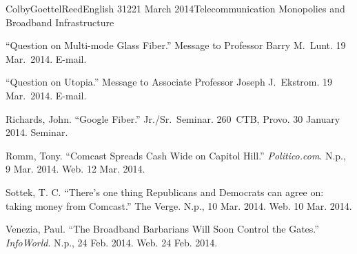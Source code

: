 \documentclass[12pt]{article}
\begin{document}
\begin{mla}{Colby}{Goettel}{Reed}{English 312}{21 March 2014}{Telecommunication Monopolies and Broadband Infrastructure}
\begin{workscited}
    \bibent ``Question on Multi-mode Glass Fiber.'' Message to Professor Barry M.\ Lunt. 19 Mar.\ 2014. E-mail.
    
    \bibent ``Question on Utopia.'' Message to Associate Professor Joseph J.\ Ekstrom. 19 Mar.\ 2014. E-mail.
    
    \bibent Richards, John. ``Google Fiber.'' Jr./Sr.\ Seminar. 260~CTB, Provo. 30 January 2014. Seminar.
    
    \bibent Romm, Tony. ``Comcast Spreads Cash Wide on Capitol Hill.'' \textit{Politico.com}. N.p., 9 Mar. 2014. Web. 12 Mar. 2014.
    
    \bibent Sottek, T. C. ``There's one thing Republicans and Democrats can agree on: taking money from Comcast.'' The Verge. N.p., 10 Mar. 2014. Web. 10 Mar. 2014.
    
    \bibent Venezia, Paul. ``The Broadband Barbarians Will Soon Control the Gates.'' \textit{InfoWorld}. N.p., 24 Feb. 2014. Web. 24 Feb. 2014.
\end{workscited}

\end{mla}
\end{document}

